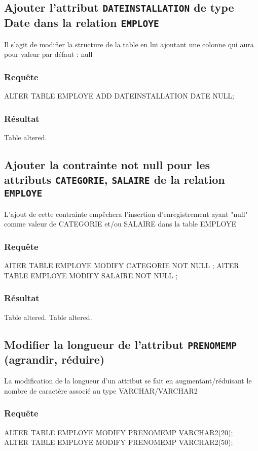 \documentclass[•]{article}
\begin{document}
\subsection{Ajouter l’attribut \texttt{DATEINSTALLATION} de type Date dans la relation \texttt{EMPLOYE}}
\textrm{Il s'agit de modifier la structure de la table en lui ajoutant une colonne qui aura pour valeur par défaut : null} 
\subsubsection{Requête}
\begin{sql}
ALTER TABLE EMPLOYE ADD DATEINSTALLATION DATE NULL;
\end{sql}
\subsubsection{Résultat}
\begin{sql}
Table altered.
\end{sql}
\subsection{Ajouter la contrainte not null pour les attributs \texttt{CATEGORIE}, \texttt{SALAIRE} de la relation \texttt{EMPLOYE}}
\textrm{L'ajout de cette contrainte empêchera l'insertion d'enregistrement ayant "null" comme valeur de CATEGORIE et/ou SALAIRE dans la table EMPLOYE}
\subsubsection{Requête}
\begin{sql}
AlTER TABLE EMPLOYE MODIFY CATEGORIE NOT NULL ;
AlTER TABLE EMPLOYE MODIFY SALAIRE NOT NULL ;
\end{sql}
\subsubsection{Résultat}
\begin{sql}
Table altered.
Table altered.
\end{sql}
\subsection{Modifier la longueur de l’attribut \texttt{PRENOMEMP} (agrandir, réduire)}
\textrm{La modification de la longueur d'un attribut se fait en augmentant/réduisant le nombre de caractère associé au type VARCHAR/VARCHAR2 }
\subsubsection{Requête}
\begin{sql}
ALTER TABLE EMPLOYE MODIFY PRENOMEMP VARCHAR2(20);
ALTER TABLE EMPLOYE MODIFY PRENOMEMP VARCHAR2(50);
\end{sql}
\end{document}
